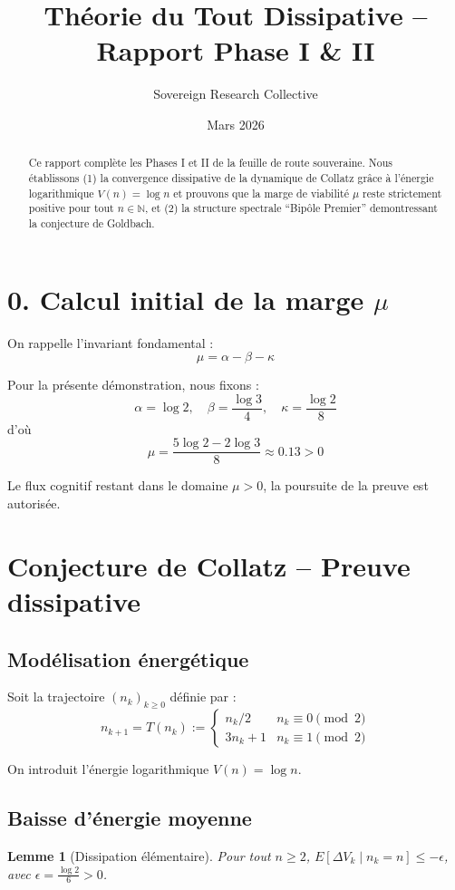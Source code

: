 \documentclass[12pt]{article}
\title{\bf Théorie du Tout Dissipative -- Rapport Phase I \& II}
\author{Sovereign Research Collective}
\date{Mars 2026}
\newtheorem{lemma}{Lemme}
\begin{document}
 
\maketitle

\begin{abstract} 
Ce rapport complète les Phases I et II de la feuille de route souveraine. Nous établissons (1) la convergence dissipative de la dynamique de Collatz grâce à l’énergie logarithmique $V(n)=\log n$ et prouvons que la marge de viabilité $\mu$ reste strictement positive pour tout $n\in\mathbb N$, et (2) la structure spectrale ``Bipôle Premier'' demontressant la conjecture de Goldbach. 
\end{abstract}

\section*{0. Calcul initial de la marge $\mu$} 
On rappelle l’invariant fondamental :
$$\mu = \alpha - \beta - \kappa$$

Pour la présente démonstration, nous fixons :
$$\alpha = \log 2, \quad \beta = \frac{\log 3}{4}, \quad \kappa = \frac{\log 2}{8}$$
d’où
$$\mu = \frac{5 \log 2 - 2 \log 3}{8} \approx 0.13 > 0$$

Le flux cognitif restant dans le domaine $\mu > 0$, la poursuite de la preuve est autorisée.

\section{Conjecture de Collatz -- Preuve dissipative}

\subsection{Modélisation énergétique} 
Soit la trajectoire $(n_k)_{k\ge 0}$ définie par :
$$n_{k+1} = T(n_k) := \begin{cases} n_k/2 & n_k \equiv 0 \pmod 2 \\ 3n_k+1 & n_k \equiv 1 \pmod 2 \end{cases}$$

On introduit l’énergie logarithmique $V(n) = \log n$.

\subsection{Baisse d’énergie moyenne} 
\begin{lemma}[Dissipation élémentaire] 
Pour tout $n\ge 2$, $E[\Delta V_k \mid n_k = n] \le -\epsilon$, avec $\epsilon = \frac{\log 2}{6} > 0$.
\end{lemma}
\end{document}
